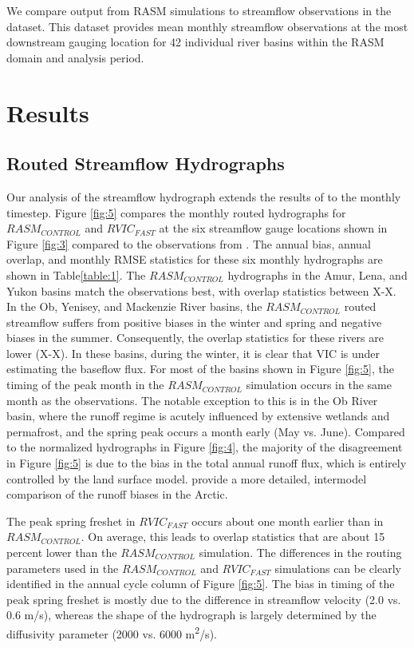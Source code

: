 \documentclass[jgrga, draft]{agutex}
\begin{document}
\begin{article}
We compare output from RASM simulations to streamflow observations in the \citet{Dai_2009} dataset.
This dataset provides mean monthly streamflow observations at the most downstream gauging location for 42 individual river basins within the RASM domain and analysis period.

\section{Results}

\subsection{Routed Streamflow Hydrographs}

Our analysis of the streamflow hydrograph extends the results of \citet{Hamman_2016} to the monthly timestep.
Figure \ref{fig:5} compares the monthly routed hydrographs for $RASM_{CONTROL}$ and $RVIC_{FAST}$ at the six streamflow gauge locations shown in Figure \ref{fig:3} compared to the observations from \citep{Dai_2009}.
The annual bias, annual overlap, and monthly RMSE statistics for these six monthly hydrographs are shown in Table\ref{table:1}.
The $RASM_{CONTROL}$ hydrographs in the Amur, Lena, and Yukon basins match the observations best, with overlap statistics between X-X.
In the Ob, Yenisey, and Mackenzie River basins, the $RASM_{CONTROL}$ routed streamflow suffers from positive biases in the winter and spring and negative biases in the summer.
Consequently, the overlap statistics for these rivers are lower (X-X).
In these basins, during the winter, it is clear that VIC is under estimating the baseflow flux.
For most of the basins shown in Figure \ref{fig:5}, the timing of the peak month in the $RASM_{CONTROL}$ simulation occurs in the same month as the observations.
The notable exception to this is in the Ob River basin, where the runoff regime is acutely influenced by extensive wetlands and permafrost, and the spring peak occurs a month early (May vs. June).
Compared to the normalized hydrographs in Figure \ref{fig:4}, the majority of the disagreement in Figure \ref{fig:5} is due to the bias in the total annual runoff flux, which is entirely controlled by the land surface model.
\citet{Hamman_2016} provide a more detailed, intermodel comparison of the runoff biases in the Arctic.

The peak spring freshet in $RVIC_{FAST}$ occurs about one month earlier than in $RASM_{CONTROL}$.
On average, this leads to overlap statistics that are about 15 percent lower than the $RASM_{CONTROL}$ simulation.
The differences in the routing parameters used in the $RASM_{CONTROL}$ and $RVIC_{FAST}$ simulations can be clearly identified in the annual cycle column of Figure \ref{fig:5}.
The bias in timing of the peak spring freshet is mostly due to the difference in streamflow velocity (2.0 vs. 0.6 m/s), whereas the shape of the hydrograph is largely determined by the diffusivity parameter (2000 vs. 6000 m\textsuperscript{2}/s).


\end{article}
\end{document}
